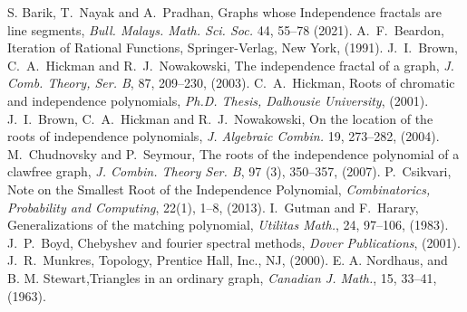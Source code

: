 \documentclass[12pt,a4paper]{article}
\theoremstyle{plain}
\numberwithin{equation}{section}
\begin{document}

\begin{thebibliography}{}
 S. Barik, T.~Nayak and A.~Pradhan, Graphs whose  Independence fractals are line segments, \emph{Bull. Malays. Math. Sci. Soc.} 44, 55–78 (2021). 
  A.~F.~Beardon,  Iteration of Rational Functions, Springer-Verlag, New York, (1991).
 J.~I.~Brown, C.~A.~Hickman and R.~J.~Nowakowski, The independence fractal of a graph, \emph{J. Comb. Theory, Ser. B}, 87, 209--230, (2003).
 C.~A.~Hickman, Roots of chromatic and independence polynomials, \emph{Ph.D. Thesis, Dalhousie University}, (2001).
  J.~I.~Brown, C.~A.~Hickman and R.~J.~Nowakowski, On the location of the roots of independence polynomials, \emph{J. Algebraic Combin.} 19, 273--282, (2004).
  M.~Chudnovsky and P.~Seymour, The roots of the independence polynomial of a clawfree graph, \emph{J. Combin. Theory Ser. B}, 97 (3), 350–357, (2007).
 P.~Csikvari, Note on the Smallest Root of the Independence Polynomial, \emph{Combinatorics, Probability and Computing}, 22(1), 1--8, (2013).
  I.~Gutman and F.~Harary, Generalizations of the matching polynomial, \emph{Utilitas Math.}, 24, 97--106, (1983).
   J.~P.~Boyd, Chebyshev and fourier spectral methods,  \emph{Dover Publications}, (2001).
   J.~R.~Munkres, Topology, Prentice Hall, Inc., NJ, (2000).
     E. A. Nordhaus, and  B. M. Stewart,Triangles in an ordinary graph, \emph{Canadian J. Math.},  15, 33--41, (1963).
\end{thebibliography}
\end{document}
